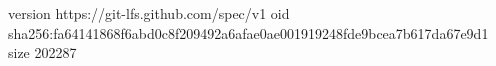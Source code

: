 version https://git-lfs.github.com/spec/v1
oid sha256:fa64141868f6abd0c8f209492a6afae0ae001919248fde9bcea7b617da67e9d1
size 202287
